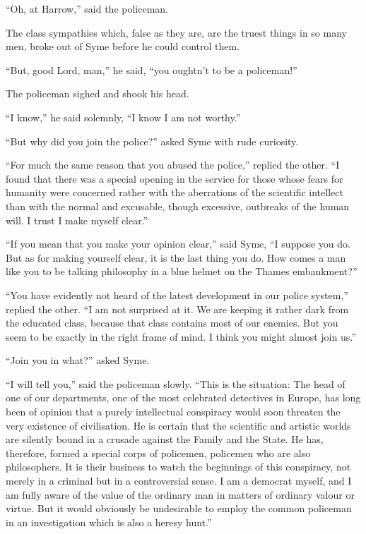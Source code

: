 “Oh, at Harrow,” said the policeman.

The class sympathies which, false as they are, are the truest things in so many men, broke out of Syme before he could control them.

“But, good Lord, man,” he said, “you oughtn’t to be a policeman!”

The policeman sighed and shook his head.

“I know,” he said solemnly, “I know I am not worthy.”

“But why did you join the police?” asked Syme with rude curiosity.

“For much the same reason that you abused the police,” replied the other. “I found that there was a special opening in the service for those whose fears for humanity were concerned rather with the aberrations of the scientific intellect than with the normal and excusable, though excessive, outbreaks of the human will. I trust I make myself clear.”

“If you mean that you make your opinion clear,” said Syme, “I suppose you do. But as for making yourself clear, it is the last thing you do. How comes a man like you to be talking philosophy in a blue helmet on the Thames embankment?”

“You have evidently not heard of the latest development in our police system,” replied the other. “I am not surprised at it. We are keeping it rather dark from the educated class, because that class contains most of our enemies. But you seem to be exactly in the right frame of mind. I think you might almost join us.”

“Join you in what?” asked Syme.

“I will tell you,” said the policeman slowly. “This is the situation: The head of one of our departments, one of the most celebrated detectives in Europe, has long been of opinion that a purely intellectual conspiracy would soon threaten the very existence of civilisation. He is certain that the scientific and artistic worlds are silently bound in a crusade against the Family and the State. He has, therefore, formed a special corps of policemen, policemen who are also philosophers. It is their business to watch the beginnings of this conspiracy, not merely in a criminal but in a controversial sense. I am a democrat myself, and I am fully aware of the value of the ordinary man in matters of ordinary valour or virtue. But it would obviously be undesirable to employ the common policeman in an investigation which is also a heresy hunt.”

